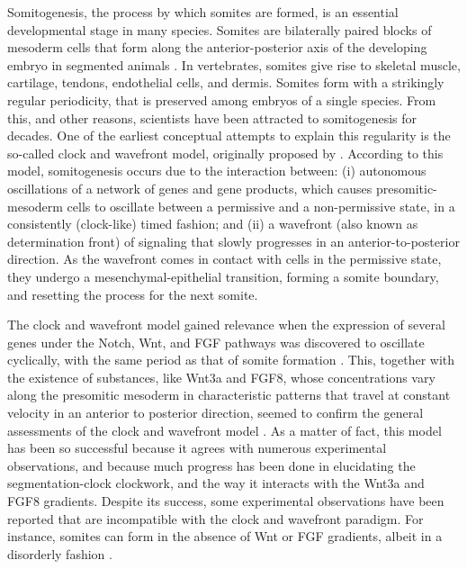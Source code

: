 \documentclass[11pt]{article}
\begin{document}
	Somitogenesis, the process by which somites are formed, is an essential
	developmental stage in many species. Somites are bilaterally paired blocks of
	mesoderm cells that form along the anterior-posterior axis of the developing
	embryo in segmented animals \citep{Maroto2012}. In vertebrates, somites give
	rise to skeletal muscle, cartilage, tendons, endothelial cells, and dermis.
	Somites form with a strikingly regular periodicity, that is preserved among
	embryos of a single species. From this, and other reasons, scientists have been
	attracted to somitogenesis for decades. One of the earliest conceptual attempts
	to explain this regularity is the so-called clock and wavefront model,
	originally proposed by \citet{Cooke1976}. According to this model, somitogenesis
	occurs due to the interaction between: (i) autonomous oscillations of a network
	of genes and gene products, which causes presomitic-mesoderm cells to oscillate
	between a permissive and a non-permissive state, in a consistently (clock-like)
	timed fashion; and (ii) a wavefront (also known as determination front) of
	signaling that slowly progresses in an anterior-to-posterior direction. As the
	wavefront comes in contact with cells in the permissive state, they undergo a
	mesenchymal-epithelial transition, forming a somite boundary, and resetting the
	process for the next somite.
	
	The clock and wavefront model gained relevance when the expression of several
	genes under the Notch, Wnt, and FGF pathways was discovered to oscillate
	cyclically, with the same period as that of somite formation
	\citep{Palmeirim1997, Pourquie2001, Gibb2010, Pourquie2011}. This, together with
	the existence of substances, like Wnt3a and FGF8, whose concentrations
	vary along the presomitic mesoderm in characteristic patterns that travel at
	constant velocity in an anterior to posterior direction, seemed to confirm the
	general assessments of the clock and wavefront model \citep{Dubrulle2001,
		Gibb2010, Pourquie2011}. As a matter of fact, this model has been so
	successful because it agrees with numerous experimental observations, and
	because much progress has been done in elucidating the segmentation-clock
	clockwork, and the way it interacts with the Wnt3a and FGF8 gradients.
	Despite its success, some experimental observations have been reported that are
	incompatible with the clock and wavefront paradigm. For instance, somites can
	form in the absence of Wnt or FGF gradients, albeit in a disorderly
	fashion \citep{Naiche2011,Dias2014}.
	
\end{document}
